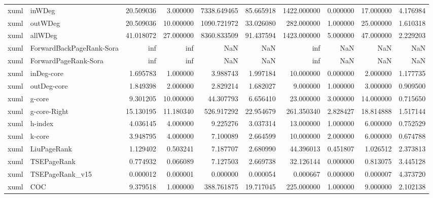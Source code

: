 \begin{tabular}{llrrrrrrrr}
xuml & inWDeg & 20.509036 & 3.000000 & 7338.649465 & 85.665918 & 1422.000000 & 0.000000 & 17.000000 & 4.176984 \\
xuml & outWDeg & 20.509036 & 10.000000 & 1090.721972 & 33.026080 & 282.000000 & 1.000000 & 25.000000 & 1.610318 \\
xuml & allWDeg & 41.018072 & 27.000000 & 8360.833509 & 91.437594 & 1423.000000 & 5.000000 & 47.000000 & 2.229203 \\
xuml & ForwardBackPageRank-Sora & inf & inf & NaN & NaN & inf & NaN & NaN & NaN \\
xuml & ForwardPageRank-Sora & inf & inf & NaN & NaN & inf & NaN & NaN & NaN \\
xuml & inDeg-core & 1.695783 & 1.000000 & 3.988743 & 1.997184 & 10.000000 & 0.000000 & 2.000000 & 1.177735 \\
xuml & outDeg-core & 1.849398 & 2.000000 & 2.829214 & 1.682027 & 9.000000 & 1.000000 & 3.000000 & 0.909500 \\
xuml & g-core & 9.301205 & 10.000000 & 44.307793 & 6.656410 & 23.000000 & 3.000000 & 14.000000 & 0.715650 \\
xuml & g-core-Right & 15.130195 & 11.180340 & 526.917292 & 22.954679 & 261.350340 & 2.828427 & 18.814888 & 1.517144 \\
xuml & h-index & 4.036145 & 4.000000 & 9.225276 & 3.037314 & 13.000000 & 1.000000 & 6.000000 & 0.752529 \\
xuml & k-core & 3.948795 & 4.000000 & 7.100089 & 2.664599 & 10.000000 & 2.000000 & 6.000000 & 0.674788 \\
xuml & LiuPageRank & 1.129402 & 0.503241 & 7.187707 & 2.680990 & 44.396013 & 0.451807 & 1.026512 & 2.373813 \\
xuml & TSEPageRank & 0.774932 & 0.066089 & 7.127503 & 2.669738 & 32.126144 & 0.000000 & 0.813075 & 3.445128 \\
xuml & TSEPageRank_v15 & 0.000012 & 0.000001 & 0.000000 & 0.000054 & 0.000667 & 0.000000 & 0.000007 & 4.373720 \\
xuml & COC & 9.379518 & 1.000000 & 388.761875 & 19.717045 & 225.000000 & 1.000000 & 9.000000 & 2.102138 \\
\bottomrule
\end{tabular}
